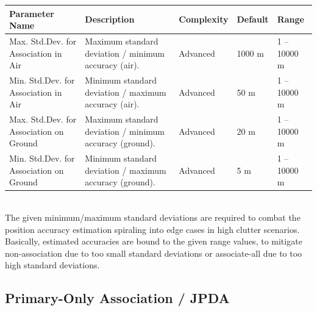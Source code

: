 \begin{table}[H]
    \centering
    \footnotesize
    \hspace*{-1.5cm}
    \begin{tabular}{|p{4.5cm}|p{6.5cm}|l|l|l|}
    \hline
    \textbf{Parameter Name} & \textbf{Description} & \textbf{Complexity} & \textbf{Default} & \textbf{Range} \\ \hline
    Max. Std.Dev. for Association in Air & Maximum standard deviation / minimum accuracy (air).  & Advanced & 1000 m & 1 -- 10000 m \\ \hline
    Min. Std.Dev. for Association in Air & Minimum standard deviation / maximum accuracy (air). & Advanced & 50 m & 1 -- 10000 m \\ \hline
    Max. Std.Dev. for Association on Ground & Maximum standard deviation / minimum accuracy (ground). & Advanced & 20 m & 1 -- 10000 m \\ \hline
    Min. Std.Dev. for Association on Ground & Minimum standard deviation / maximum accuracy (ground). & Advanced & 5 m & 1 -- 10000 m \\ \hline
    \end{tabular}
\end{table}
\ \\
The given minimum/maximum standard deviations are required to combat the position accuracy estimation spiraling into edge cases in high clutter scenarios. Basically, estimated accuracies are bound to the given range values, to mitigate non-association due to too small standard deviations or associate-all due to too high standard deviations.



\subsection{Primary-Only Association / JPDA}

